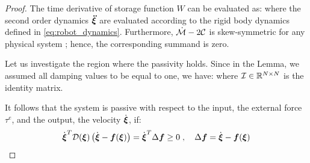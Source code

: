 \begin{proof}
The time derivative of storage function $W$ can be evaluated as:
where the second order dynamics $\boldsymbol{\ddot \xi}$ are evaluated according to the rigid body dynamics defined in \eqref{eq:robot_dynamics}. Furthermore, $\dot{\mathcal{M}} - 2 \mathcal{C}$ is skew-symmetric for any physical system \parencite{slotine1987adaptive}; hence, the corresponding summand is zero.

Let us investigate the region where the passivity holds. Since in the Lemma, we assumed all damping values to be equal to one, we have:
where $\mathcal{I} \in \mathbb{R}^{N \times N}$ is the identity matrix.

It follows that the system is passive with respect to the input, the external force $\tau^e$, and the output, the velocity $\dot {\boldsymbol{\xi}}$, if: 
\begin{equation}
	\dot{\boldsymbol {\boldsymbol{\xi}}}^T \mathcal{D}({\boldsymbol{\xi}}) \left(\dot{\boldsymbol {\boldsymbol{\xi}}} - \boldsymbol{f}(\boldsymbol {\boldsymbol{\xi}}) \right) = 
    \dot{{\boldsymbol{\xi}}} ^ T \Delta \boldsymbol{f}  \geq 0 
 \; , \quad
 \Delta \boldsymbol{f} = \dot{{\boldsymbol{\xi}}} - \boldsymbol{f}({\boldsymbol{\xi}})
 \label{eq:passivity_condition}
\end{equation}


\end{proof}
